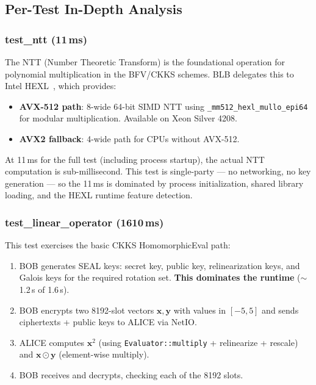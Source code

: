 \subsection{Per-Test In-Depth Analysis}

\subsubsection{test\_ntt (11\,ms)}

The NTT (Number Theoretic Transform) is the foundational operation for polynomial multiplication in the BFV/CKKS schemes.
BLB delegates this to Intel HEXL~\cite{hexl2023}, which provides:
\begin{itemize}[nosep]
  \item \textbf{AVX-512 path}: 8-wide 64-bit SIMD NTT using \texttt{\_mm512\_hexl\_mullo\_epi64} for modular multiplication. Available on Xeon Silver 4208.
  \item \textbf{AVX2 fallback}: 4-wide path for CPUs without AVX-512.
\end{itemize}

At 11\,ms for the full test (including process startup), the actual NTT computation is sub-millisecond.
This test is single-party --- no networking, no key generation --- so the 11\,ms is dominated by process initialization, shared library loading, and the HEXL runtime feature detection.

\subsubsection{test\_linear\_operator (1610\,ms)}

This test exercises the basic CKKS HomomorphicEval path:
\begin{enumerate}[nosep]
  \item BOB generates SEAL keys: secret key, public key, relinearization keys, and Galois keys for the required rotation set. \textbf{This dominates the runtime} ($\sim$1.2\,s of 1.6\,s).
  \item BOB encrypts two 8192-slot vectors $\mathbf{x}, \mathbf{y}$ with values in $[-5, 5]$ and sends ciphertexts + public keys to ALICE via NetIO.
  \item ALICE computes $\mathbf{x}^2$ (using \texttt{Evaluator::multiply} + relinearize + rescale) and $\mathbf{x} \odot \mathbf{y}$ (element-wise multiply).
  \item BOB receives and decrypts, checking each of the 8192 slots.
\end{enumerate}

